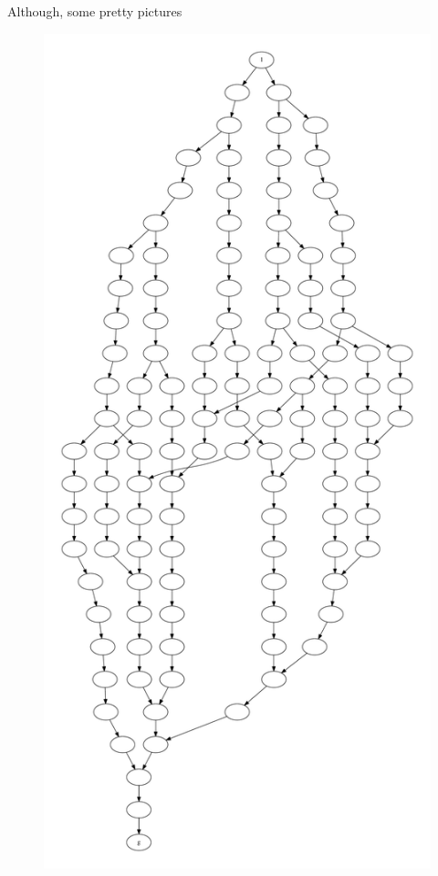 \documentclass{beamer}
\begin{document}
{\begin{frame}{Although, some pretty pictures}
\begin{figure}
	\includegraphics[height=.9\textheight]{figure/patterns/pattern3}
	\hfill
\end{figure}
\end{frame}
}
\end{document}
